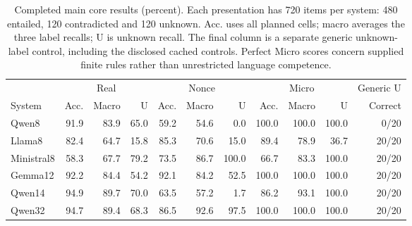 \begin{table}[t]
\centering
\caption{Completed main core results (percent). Each presentation has 720 items per system: 480 entailed, 120 contradicted and 120 unknown. Acc. uses all planned cells; macro averages the three label recalls; U is unknown recall. The final column is a separate generic unknown-label control, including the disclosed cached controls. Perfect Micro scores concern supplied finite rules rather than unrestricted language competence.}
\label{tab:core_results}
\setlength{\tabcolsep}{4pt}
\begin{tabular}{lrrrrrrrrrr}
\toprule
 & \multicolumn{3}{c}{Real} & \multicolumn{3}{c}{Nonce} & \multicolumn{3}{c}{Micro} & Generic U\\
System & Acc. & Macro & U & Acc. & Macro & U & Acc. & Macro & U & Correct\\
\midrule
Qwen8 & 91.9 & 83.9 & 65.0 & 59.2 & 54.6 & 0.0 & 100.0 & 100.0 & 100.0 & 0/20 \\
Llama8 & 82.4 & 64.7 & 15.8 & 85.3 & 70.6 & 15.0 & 89.4 & 78.9 & 36.7 & 20/20 \\
Ministral8 & 58.3 & 67.7 & 79.2 & 73.5 & 86.7 & 100.0 & 66.7 & 83.3 & 100.0 & 20/20 \\
Gemma12 & 92.2 & 84.4 & 54.2 & 92.1 & 84.2 & 52.5 & 100.0 & 100.0 & 100.0 & 20/20 \\
Qwen14 & 94.9 & 89.7 & 70.0 & 63.5 & 57.2 & 1.7 & 86.2 & 93.1 & 100.0 & 20/20 \\
Qwen32 & 94.7 & 89.4 & 68.3 & 86.5 & 92.6 & 97.5 & 100.0 & 100.0 & 100.0 & 20/20 \\
\bottomrule
\end{tabular}
\end{table}
